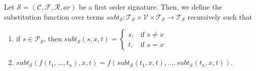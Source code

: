 \begin{definition}%
    Let $\mathcal{S} = (\mathcal{C},\mathcal{F},\mathcal{R},ar)$ be a first order signature. Then, we define the substitution function over terms $subt_{\mathcal{S}} : \mathcal{T}_{\mathcal{S}} \times \mathcal{V} \times \mathcal{T}_{\mathcal{S}} \to \mathcal{T}_{\mathcal{S}}$ recursively such that
    \begin{enumerate}
        \item if $s \in \mathcal{P}_{\mathcal{S}}$, then $subt_{\mathcal{S}}(s,x,t) = \begin{cases}
                        s, &\text{if }s \not = x \\
                        t, &\text{if }s = x
                        \end{cases}$
        \item $subt_{\mathcal{S}}(f(t_1,...,t_n),x,t) = f(subt_{\mathcal{S}}(t_1,x,t),...,subt_{\mathcal{S}}(t_n,x,t))$.
    \end{enumerate}
\end{definition}


